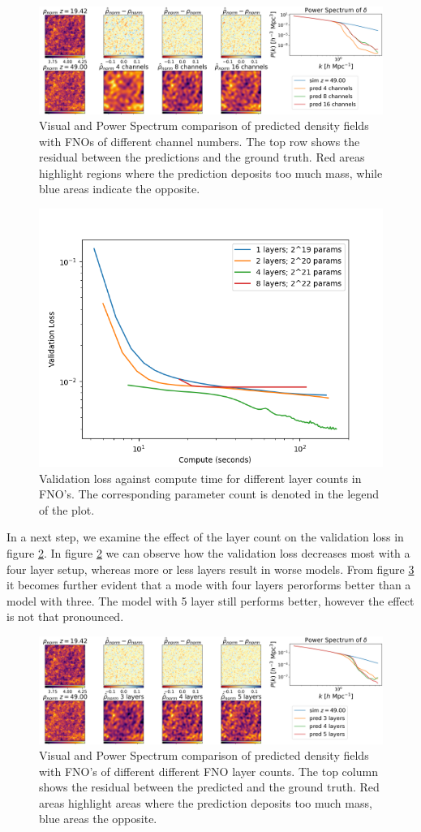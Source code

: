 \documentclass{article}
\begin{document}
\begin{figure}[t]
    \centering
    \includegraphics[width=0.95\linewidth]{img/compare_channels.png}
    \caption{Visual and Power Spectrum comparison of predicted density fields with FNOs of different channel numbers. The top row shows the residual between the predictions and the ground truth. Red areas highlight regions where the prediction deposits too much mass, while blue areas indicate the opposite.}
    \label{fig:channels-A}
\end{figure}

\begin{figure}[h]
    \centering
    \includegraphics[width=0.4\linewidth]{img/layer_compute.png}
    \caption{Validation loss against compute time for different layer counts in FNO's. The corresponding parameter count is denoted in the legend of the plot.}
    \label{fig:layer-B}
\end{figure}


In a next step, we examine the effect of the layer count on the validation loss in figure \ref{fig:layer-B}. In figure \ref{fig:layer-B} we can observe how the validation loss decreases most with a four layer setup, whereas more or less layers result in worse models. From figure \ref{fig:layer-A} it becomes further evident that a mode with four layers perorforms better than a model with three. The model with 5 layer still performs better, however the effect is not that pronounced. 

\begin{figure}[h]
    \centering
    \includegraphics[width=0.95\linewidth]{img/compare_layers_2.png}
    \caption{Visual and Power Spectrum comparison of predicted density fields with FNO's of different different FNO layer counts. The top column shows the residual between the predicted and the ground truth. Red areas highlight areas where the prediction deposits too much mass, blue areas the opposite. }
    \label{fig:layer-A}
\end{figure}
\end{document}
